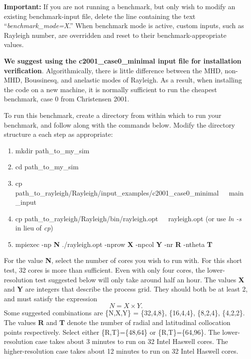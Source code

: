 \textbf{Important:}  If you are not running a benchmark, but only wish to modify an existing benchmark-input file, delete the line containing the text ``\textit{benchmark\_mode=X}.''  When benchmark mode is active, custom inputs, such as Rayleigh number, are overridden and reset to their benchmark-appropriate values.

\textbf{We suggest using the c2001\_case0\_minimal input file for installation verification}.  Algorithmically, there is little difference between the MHD, non-MHD, Boussinesq, and anelastic modes of Rayleigh.  As a result, when installing the code on a new machine, it is normally sufficient to run the cheapest benchmark, case 0 from Christensen 2001.

To run this benchmark, create a directory from within which to run your benchmark, and follow along with the commands below.  Modify the directory structure a each step as appropriate:
\begin{enumerate}
\item mkdir {path\_to\_my\_sim}
\item cd {path\_to\_my\_sim}
\item cp {path\_to\_rayleigh/Rayleigh/input\_examples/c2001\_case0\_minimal~~~main\_input}
\item cp path\_to\_rayleigh/Rayleigh/bin/rayleigh.opt~~~rayleigh.opt  (or use \textit{ln -s}  in lieu of \textit{cp})
\item mpiexec -np \textbf{N} ./rayleigh.opt -nprow \textbf{X} -npcol \textbf{Y} -nr \textbf{R} -ntheta \textbf{T}
\end{enumerate}

For the value \textbf{N}, select the number of cores you wish to run with. For this short test, 32 cores is more than sufficient.  Even with only four cores, the lower-resolution test suggested below will only take around half an hour.  The values \textbf{X} and \textbf{Y} are integers that describe the process grid.   They should both be at least 2, and must satisfy the expression
\begin{equation}
N=X \times Y.
\end{equation}
Some suggested combinations are \{N,X,Y\} = \{32,4,8\}, \{16,4,4\}, \{8,2,4\}, \{4,2,2\}.   The values \textbf{R} and \textbf{T} denote the number of radial and latitudinal collocation points respectively.   Select either \{R,T\}=\{48,64\} or \{R,T\}=\{64,96\}.  The lower-resolution case takes about 3 minutes to run on 32 Intel Haswell cores.  The higher-resolution case takes about 12 minutes to run on 32 Intel Haswell cores.

